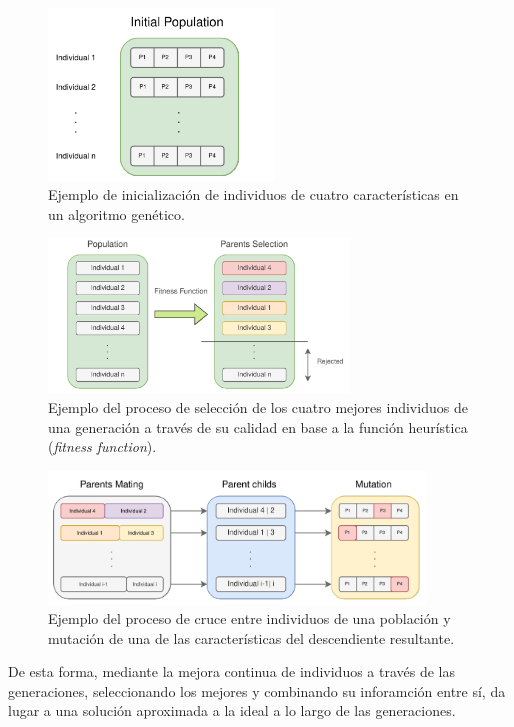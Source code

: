 \documentclass{uathesis-es}
\begin{document}
\begin{figure}[H]
    \centering
    \includegraphics[width=6cm]{Figures/GA/inicializacion.png}
    \caption{Ejemplo de inicialización de individuos de cuatro características en un algoritmo genético.}
    \label{GA_inicializacion}
\end{figure}
\begin{figure}[H]
    \centering
    \includegraphics[width=8cm]{Figures/GA/selection.png}
    \caption{Ejemplo del proceso de selección de los cuatro mejores individuos de una generación a través de su calidad en base a la función heurística (\textit{fitness function}).}
    \label{GA_selection}
\end{figure}
\begin{figure}[H]
    \centering
    \includegraphics[width=10cm]{Figures/GA/cruce_mutacion.png}
    \caption{Ejemplo del proceso de cruce entre individuos de una población y mutación de una de las características del descendiente resultante.}
    \label{GA_cruce_mutacion}
\end{figure}

De esta forma, mediante la mejora continua de individuos a través de las generaciones, seleccionando los mejores y combinando su inforamción entre sí, da lugar a una solución aproximada a la ideal a lo largo de las generaciones.
\end{document}
